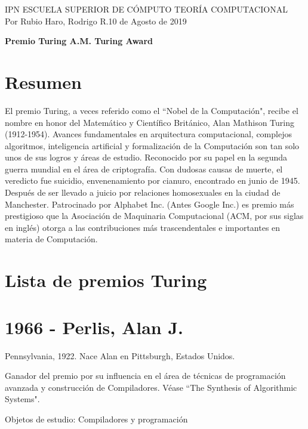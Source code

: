 \documentclass[a4paper, 11pt]{article}
\begin{document}
\noindent
\normalsize IPN \hfill \textbar \hfill ESCUELA SUPERIOR DE CÓMPUTO \hfill \textbar \hfill TEORÍA COMPUTACIONAL \\
Por Rubio Haro, Rodrigo R.\hfill 10 de Agosto de 2019 \\
 
\begin{center}
    \large\textbf{Premio Turing \textbar \hspace{.1mm} A.M. Turing Award} \\
\end{center}


\section*{Resumen}
El premio Turing, a veces referido como el ``Nobel de la Computación", recibe el nombre en honor del Matemático y Científico Británico, Alan Mathison Turing (1912-1954). Avances fundamentales en arquitectura computacional, complejos algoritmos, inteligencia artificial y formalización de la Computación son tan solo unos de sus logros y áreas de estudio. Reconocido por su papel en la segunda guerra mundial en el área de criptografía. Con dudosas causas de muerte, el veredicto fue suicidio, envenenamiento por cianuro, encontrado en junio de 1945. Después de ser llevado a juicio por relaciones homosexuales en la ciudad de Manchester.
Patrocinado por Alphabet Inc. (Antes Google Inc.) es premio más prestigioso que la Asociación de Maquinaria Computacional (ACM, por sus siglas en inglés) otorga a las contribuciones más trascendentales e importantes en materia de Computación.


\section*{Lista de premios Turing}

\section*{1966 - Perlis, Alan J.}
\noindent Pennsylvania, 1922. Nace Alan en Pittsburgh, Estados Unidos.

\noindent Ganador del premio por su influencia en el área de técnicas de programación avanzada y construcción de Compiladores. Véase ``The Synthesis of Algorithmic Systems". 

\noindent Objetos de estudio: Compiladores y programación
\end{document}
